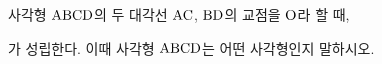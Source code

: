 사각형 $\mathrm{ABCD}$의 두 대각선 $\mathrm{AC}$, $\mathrm{BD}$의 교점을 $\mathrm{O}$라 할 때, \par\smallskip{}\par\smallskip\noindent 가 성립한다. 이때 사각형 $\mathrm{ABCD}$는 어떤 사각형인지 말하시오.
